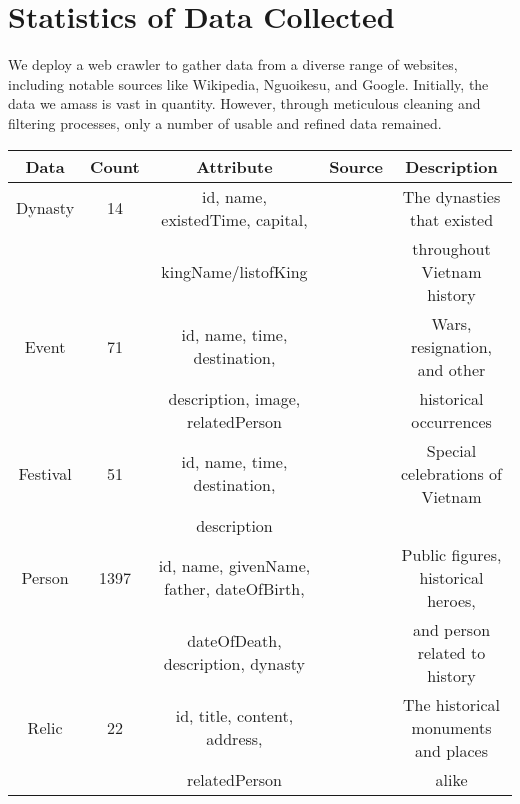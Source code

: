 \documentclass[a4paper,10pt,notitlepage]{article}
\begin{document}
\section{\textbf{Statistics of Data Collected}}
{\setlength{\parskip}{0.5cm}
\vspace{-0.5cm}
\hspace{1 cm}

\hspace{1 cm}We deploy a web crawler to gather data from a diverse range of websites, including notable sources like Wikipedia, Nguoikesu, and Google. Initially, the data we amass is vast in quantity. However, through meticulous cleaning and filtering processes, only a number of usable and refined data remained.
\\[0.3 in]
\begin{adjustbox}{max width=\textwidth}
        \begin{tabular}{|c|c|c|c|c|}
    \hline
       Data  & Count & Attribute & Source & Description \\
       \hline\hline
       Dynasty & 14 & id, name, existedTime, capital,  & & The dynasties that existed  \\
        & & kingName/listofKing & & throughout Vietnam history\\
    \hline
    Event & 71 & id, name, time, destination, & & Wars, resignation, and other \\
    & & description, image, relatedPerson & &  historical occurrences\\
    \hline
    Festival & 51 & id, name, time, destination,  & & Special celebrations of Vietnam\\
     & & description & & \\
    \hline
    Person & 1397 & id, name, givenName, father, dateOfBirth, & & Public figures, historical heroes,\\
     & & dateOfDeath, description, dynasty & &  and person related to history\\
    \hline
    Relic & 22 & id, title, content, address,& & The historical monuments and places \\
     & &  relatedPerson  & & alike\\
    \hline
       
    \end{tabular}
\end{adjustbox}

}
\end{document}
